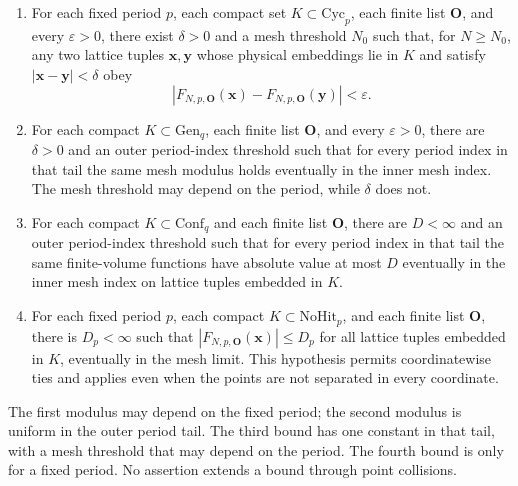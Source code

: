 \begin{theorem}
\begin{enumerate}
\item For each fixed period $p$, each compact set $K\subset\mathrm{Cyc}_p$, each finite list $\mathbf O$, and every $\varepsilon>0$, there exist $\delta>0$ and a mesh threshold $N_0$ such that, for $N\geq N_0$, any two lattice tuples $\mathbf x,\mathbf y$ whose physical embeddings lie in $K$ and satisfy $|\mathbf x-\mathbf y|<\delta$ obey
\[
 |F_{N,p,\mathbf O}(\mathbf x)-F_{N,p,\mathbf O}(\mathbf y)|<\varepsilon.
\]
\item For each compact $K\subset\mathrm{Gen}_q$, each finite list $\mathbf O$, and every $\varepsilon>0$, there are $\delta>0$ and an outer period-index threshold such that for every period index in that tail the same mesh modulus holds eventually in the inner mesh index. The mesh threshold may depend on the period, while $\delta$ does not.
\item For each compact $K\subset\mathrm{Conf}_q$ and each finite list $\mathbf O$, there are $D<\infty$ and an outer period-index threshold such that for every period index in that tail the same finite-volume functions have absolute value at most $D$ eventually in the inner mesh index on lattice tuples embedded in $K$.
\item For each fixed period $p$, each compact $K\subset\mathrm{NoHit}_p$, and each finite list $\mathbf O$, there is $D_p<\infty$ such that $|F_{N,p,\mathbf O}(\mathbf x)|\leq D_p$ for all lattice tuples embedded in $K$, eventually in the mesh limit. This hypothesis permits coordinatewise ties and applies even when the points are not separated in every coordinate.
\end{enumerate}
The first modulus may depend on the fixed period; the second modulus is uniform in the outer period tail. The third bound has one constant in that tail, with a mesh threshold that may depend on the period. The fourth bound is only for a fixed period. No assertion extends a bound through point collisions.
\end{theorem}

